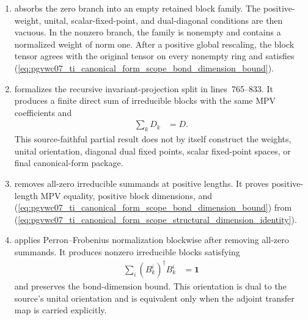 \documentclass{article}
\begin{document}
\begin{enumerate}
    \item
          absorbs the zero branch into an empty retained block family. The
          positive-weight, unital, scalar-fixed-point, and dual-diagonal
          conditions are then vacuous. In the nonzero branch, the family is
          nonempty and contains a normalized weight of norm one. After a
          positive global rescaling, the block tensor agrees with the original
          tensor on every nonempty ring and satisfies
          (\ref{eq:pgvwc07_ti_canonical_form_scope_bond_dimension_bound}).

    \item
           formalizes the
          recursive invariant-projection split in lines~765--833. It produces
          a finite direct sum of irreducible blocks with the same MPV
          coefficients and
          \begin{align}
              \sum_k D_k
                  &= D.
              \label{eq:pgvwc07_ti_canonical_form_scope_structural_dimension_identity}
          \end{align}
          This source-faithful partial result does not by itself construct the
          weights, unital orientation, diagonal dual fixed points, scalar
          fixed-point spaces, or final canonical-form package.

    \item
          removes all-zero irreducible summands at positive lengths. It proves
          positive-length MPV equality, positive block dimensions, and
          (\ref{eq:pgvwc07_ti_canonical_form_scope_bond_dimension_bound})
          from
          (\ref{eq:pgvwc07_ti_canonical_form_scope_structural_dimension_identity}).

    \item
           applies
          Perron--Frobenius normalization blockwise after removing all-zero
          summands. It produces nonzero irreducible blocks satisfying
          \begin{align}
              \sum_i (B_k^i)^\dagger B_k^i
                  &= \mathbf{1}
              \label{eq:pgvwc07_ti_canonical_form_scope_arbitrary_tp_gauge}
          \end{align}
          and preserves the bond-dimension bound. This orientation is dual to
          the source's unital orientation and is equivalent only when the
          adjoint transfer map is carried explicitly.


\end{enumerate}
\end{document}
